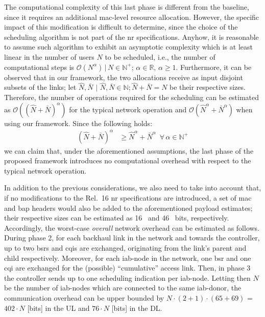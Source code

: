 The computational complexity of this last phase is different from the baseline, since it requires an additional \gls{mac}-level resource allocation. However, the specific impact of this modification is difficult to determine, since the choice of the scheduling algorithm is not part of the \gls{nr} specifications. Anyhow, it is reasonable to assume such algorithm to exhibit an asymptotic complexity which is at least linear in the number of users $N$ to be scheduled, i.e., the number of computational steps is $ \mathcal{O} \left( N^{\alpha} \right) \, | \, N \in \mathbb{N}^+ ; \, \alpha \in \mathbb{R}, \, \alpha \geq 1$. Furthermore, it can be observed that in our framework, the two allocations receive as input disjoint subsets of the links; let $\hat{N}, \bar{N} \,\, | \,\, \hat{N}, \bar{N} \in \mathbb{N}; \hat{N} + \bar{N} = N$ be their respective sizes. Therefore, 
the number of operations required for the scheduling can be estimated as $ \mathcal{O} \left( (\hat{N} + \bar{N})^{\alpha} \right)$ for the typical network operation and $ \mathcal{O} \left( \hat{N}^{\alpha} + \bar{N}^{\alpha} \right) $ when using our framework. Since the following holds:
\begin{align*}
(\hat{N} + \bar{N})^{\alpha} & \geq \hat{N}^{\alpha} + \bar{N}^{\alpha} \,\,\, \forall \, \alpha \in \mathbb{N}^+
\end{align*}
we can claim that, under the aforementioned assumptions, the last phase of the proposed framework introduces no computational overhead with respect to the typical network operation.

In addition to the previous considerations, we also need to take into account that, if no modifications to the Rel.~16 \gls{nr} specifications are introduced, a set of \gls{mac} and \gls{bap} headers would also be added to the aforementioned payload estimates; their respective sizes can be estimated as 16~\cite{3gpp_38_321} and 46~\cite{3gpp_38_340} bits, respectively. Accordingly, the worst-case \textit{overall} network overhead can be estimated as follows.
During phase 2, for each backhaul link in the network and towards the controller, up to two \glspl{bsr} and \glspl{cqi} are exchanged, originating from the link's parent and child respectively. Moreover, for each \gls{iab}-node in the network, one \gls{bsr} and one \gls{cqi} are exchanged for the (possible) ``cumulative'' access link. Then, in phase 3 the controller sends up to one scheduling indication per \gls{iab}-node. Letting then $N$ be the number of \gls{iab}-nodes which are connected to the same \gls{iab}-donor, the communication overhead can be upper bounded by $N \cdot (2 + 1) \cdot (65 + 69)$ = $402 \cdot N$ [bits] in the UL and $76 \cdot N$ [bits] in the DL.

